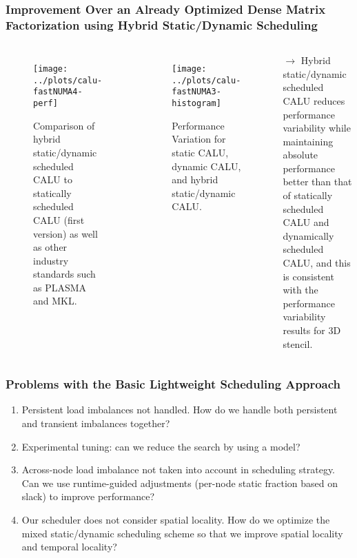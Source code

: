 \begin{frame}
\frametitle{Improvement Over an Already Optimized Dense Matrix Factorization using Hybrid Static/Dynamic Scheduling}
\begin{columns}
\begin{figure}
\texttt{[image: ../plots/calu-fastNUMA4-perf]}
\caption{\tiny Comparison of hybrid static/dynamic scheduled CALU
  to statically scheduled CALU (first version) as well as 
  other industry standards such as PLASMA and MKL.}
\end{figure}
\begin{figure}
\texttt{[image: ../plots/calu-fastNUMA3-histogram]}
\caption{\tiny Performance Variation for static CALU, dynamic CALU, and hybrid static/dynamic CALU.}
\end{figure}
{\tiny $\rightarrow$ Hybrid static/dynamic scheduled CALU reduces
  performance variability while maintaining absolute performance
  better than that of statically scheduled CALU and dynamically
  scheduled CALU, and this is consistent with the performance
  variability results for 3D stencil.} 
\end{columns}
\end{frame}

\begin{frame}
\frametitle{Problems with the Basic Lightweight Scheduling Approach}
\begin{enumerate}
\small \item \small Persistent load imbalances not handled. How do we handle both
persistent and transient imbalances together? 
\item \small Experimental tuning: can we reduce the search by using a
model?
\item \small Across-node load imbalance not taken into account in 
scheduling strategy. Can we use runtime-guided adjustments (per-node static
fraction based on slack) to improve performance?
\item \small Our scheduler does not consider spatial locality. How do
  we optimize the mixed static/dynamic scheduling scheme so that we
  improve spatial locality and temporal locality?
\end{enumerate}
\end{frame}

